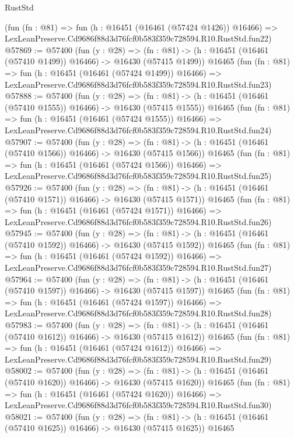 \begin{lexlean}{RustStd}
\begin{coremodule}
    (fun (fn : @81) =>
    fun (h : @16451 (@16461 (@57424 @1426)) @16466) =>
    LexLeanPreserve.Cd9686f88d3d76fcf0b583f359c728594.R10.RustStd.fun22)
@57869 := @57400
    (fun (y : @28) =>
    (fn : @81) -> (h : @16451 (@16461 (@57410 @1499)) @16466) -> @16430 (@57415 @1499))
    @16465
    (fun (fn : @81) =>
    fun (h : @16451 (@16461 (@57424 @1499)) @16466) =>
    LexLeanPreserve.Cd9686f88d3d76fcf0b583f359c728594.R10.RustStd.fun23)
@57888 := @57400
    (fun (y : @28) =>
    (fn : @81) -> (h : @16451 (@16461 (@57410 @1555)) @16466) -> @16430 (@57415 @1555))
    @16465
    (fun (fn : @81) =>
    fun (h : @16451 (@16461 (@57424 @1555)) @16466) =>
    LexLeanPreserve.Cd9686f88d3d76fcf0b583f359c728594.R10.RustStd.fun24)
@57907 := @57400
    (fun (y : @28) =>
    (fn : @81) -> (h : @16451 (@16461 (@57410 @1566)) @16466) -> @16430 (@57415 @1566))
    @16465
    (fun (fn : @81) =>
    fun (h : @16451 (@16461 (@57424 @1566)) @16466) =>
    LexLeanPreserve.Cd9686f88d3d76fcf0b583f359c728594.R10.RustStd.fun25)
@57926 := @57400
    (fun (y : @28) =>
    (fn : @81) -> (h : @16451 (@16461 (@57410 @1571)) @16466) -> @16430 (@57415 @1571))
    @16465
    (fun (fn : @81) =>
    fun (h : @16451 (@16461 (@57424 @1571)) @16466) =>
    LexLeanPreserve.Cd9686f88d3d76fcf0b583f359c728594.R10.RustStd.fun26)
@57945 := @57400
    (fun (y : @28) =>
    (fn : @81) -> (h : @16451 (@16461 (@57410 @1592)) @16466) -> @16430 (@57415 @1592))
    @16465
    (fun (fn : @81) =>
    fun (h : @16451 (@16461 (@57424 @1592)) @16466) =>
    LexLeanPreserve.Cd9686f88d3d76fcf0b583f359c728594.R10.RustStd.fun27)
@57964 := @57400
    (fun (y : @28) =>
    (fn : @81) -> (h : @16451 (@16461 (@57410 @1597)) @16466) -> @16430 (@57415 @1597))
    @16465
    (fun (fn : @81) =>
    fun (h : @16451 (@16461 (@57424 @1597)) @16466) =>
    LexLeanPreserve.Cd9686f88d3d76fcf0b583f359c728594.R10.RustStd.fun28)
@57983 := @57400
    (fun (y : @28) =>
    (fn : @81) -> (h : @16451 (@16461 (@57410 @1612)) @16466) -> @16430 (@57415 @1612))
    @16465
    (fun (fn : @81) =>
    fun (h : @16451 (@16461 (@57424 @1612)) @16466) =>
    LexLeanPreserve.Cd9686f88d3d76fcf0b583f359c728594.R10.RustStd.fun29)
@58002 := @57400
    (fun (y : @28) =>
    (fn : @81) -> (h : @16451 (@16461 (@57410 @1620)) @16466) -> @16430 (@57415 @1620))
    @16465
    (fun (fn : @81) =>
    fun (h : @16451 (@16461 (@57424 @1620)) @16466) =>
    LexLeanPreserve.Cd9686f88d3d76fcf0b583f359c728594.R10.RustStd.fun30)
@58021 := @57400
    (fun (y : @28) =>
    (fn : @81) -> (h : @16451 (@16461 (@57410 @1625)) @16466) -> @16430 (@57415 @1625))
    @16465

\end{coremodule}
\end{lexlean}
